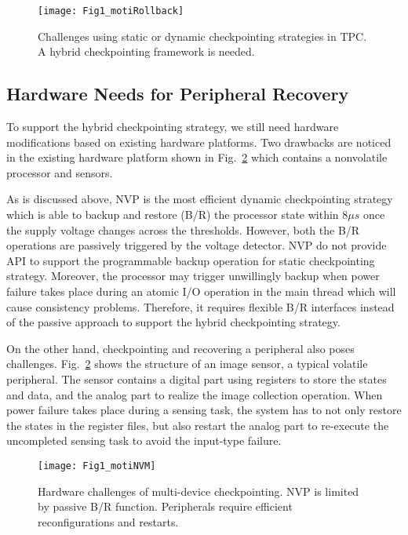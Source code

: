 %   
\begin{figure}[t]
    \centering
    \texttt{[image: Fig1\_motiRollback]}
    \caption{Challenges using static or dynamic checkpointing strategies in TPC. A hybrid checkpointing framework is needed.}
    \label{fig:motiRollback}
\end{figure}

\subsection{Hardware Needs for Peripheral Recovery} \label{sec:motiHW}
%
To support the hybrid checkpointing strategy, we still need hardware modifications based on existing hardware platforms.
Two drawbacks are noticed in the existing hardware platform shown in Fig.~\ref{fig:motiNVM} which contains a nonvolatile processor and sensors.

As is discussed above, NVP is the most efficient dynamic checkpointing strategy which is able to backup and restore (B/R) the processor state within $8\mu s$ once the supply voltage changes across the thresholds. 
However, both the B/R operations are passively triggered by the voltage detector.
NVP do not provide API to support the programmable backup operation for static checkpointing strategy.
Moreover, the processor may trigger unwillingly backup when power failure takes place during an atomic I/O operation in the main thread which will cause consistency problems. 
Therefore, it requires flexible B/R interfaces instead of the passive approach to support the hybrid checkpointing strategy.

On the other hand, checkpointing and recovering a peripheral also poses challenges.
Fig.~\ref{fig:motiNVM} shows the structure of an image sensor, a typical volatile peripheral.
The sensor contains a digital part using registers to store the states and data, and the analog part to realize the image collection operation.
When power failure takes place during a sensing task, the system has to not only restore the states in the register files, but also restart the analog part to re-execute the uncompleted sensing task to avoid the input-type failure.

\begin{figure}[t]
    \centering
    \texttt{[image: Fig1\_motiNVM]}
    \caption{Hardware challenges of multi-device checkpointing. NVP is limited by passive B/R function. Peripherals require efficient reconfigurations and restarts.}
    \label{fig:motiNVM}
\end{figure}

